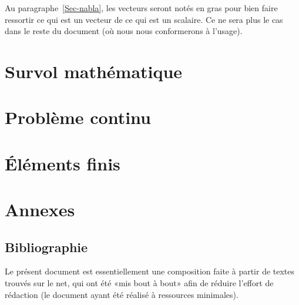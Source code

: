 \documentclass[11pt,pdflatex]{book}
\begin{document}
\medskip
Au paragraphe~\ref{Sec-nabla}, les vecteurs seront notés en gras pour bien faire ressortir ce qui est un vecteur de ce qui est un scalaire. Ce ne sera plus le cas dans le reste du document (où nous nous conformerons à l'usage).
\fi

\cleardoublepage
\tableofcontents


 \part{Survol mathématique}
 
 
 
 
 
 

 \part{Problème continu}
 
 
 
 

 \part{Éléments finis}
 
 
 
 
 
 
 
 
 
 
 
 
 

 \appendix
 \part{Annexes}
 
 
 
 
 


\ifVersionDuDocEstVincent
   \chapter*{Bibliographie}

 Le présent document est essentiellement une composition faite à partir de textes trouvés sur le net, qui ont été «mis bout à bout» afin de réduire l'effort  de rédaction (le document ayant été réalisé à ressources minimales).
\end{document}
